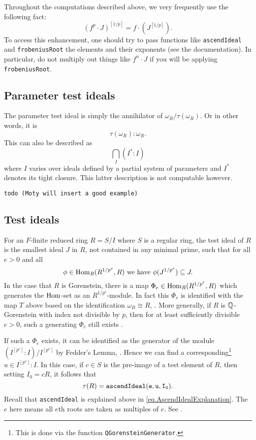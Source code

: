 \documentclass[11pt]{amsart}
\begin{document}
\begin{remark}
Throughout the computations described above, we very frequently use the following fact:
\[
(f^p \cdot J)^{[1/p]} = f \cdot (J^{[1/p]}).
\]
To access this enhancement, one should try to pass functions like {\tt ascendIdeal} and {\tt frobeniusRoot} the elements and their exponents (see the documentation).  In particular, do not multiply out things like $f^n \cdot J$ if you will be applying {\tt frobeniusRoot}.
\end{remark}

\subsection{Parameter test ideals}

The parameter test ideal is simply the annihilator of $\omega_R/\tau(\omega_R)$.  Or in other words, it is
\[
\tau(\omega_R) : \omega_R.
\]
This can also be described as
\[
\bigcap_{I} (I^* : I)
\]
where $I$ varies over ideals defined by a partial system of parameters and $I^*$ denotes its tight closure.  This latter description is not computable however.

\begin{verbatim}
todo (Moty will insert a good example)
\end{verbatim}

\subsection{Test ideals}

For an $F$-finite reduced ring $R = S/I$ where $S$ is a regular ring, the test ideal of $R$ is the smallest ideal $J$ in $R$, not contained in any minimal prime, such that for all $e > 0$ and all
\[
\phi \in \operatorname{Hom}_R(R^{1/p^e}, R) \text{ we have } \phi(J^{1/p^e}) \subseteq J.
\]
In the case that $R$ is Gorenstein, there is a map $\Phi_e \in \operatorname{Hom}_R(R^{1/p^e}, R)$ which generates the $\operatorname{Hom}$-set as an $R^{1/p^e}$-module.  In fact this $\Phi_e$ is identified with the map $T$ above based on the identification $\omega_R \cong R$, \cite{}.  More generally, if $R$ is $\mathbb{Q}$-Gorenstein with index not divisible by $p$, then for at least sufficiently divisible $e > 0$, such a generating $\Phi_e$ still exists \cite{}.

If such a $\Phi_e$ exists, it can be identified as the generator of the module $(I^{[p^e]} : I) / I^{[p^e]}$ by Fedder's Lemma, \cite{}.  Hence we can find a corresponding\footnote{This is done via the function {\tt QGorensteinGenerator}. } $u \in I^{[p^e]} : I$.  In this case, if $c \in S$ is the pre-image of a test element of $R$, then setting $I_0 = cR$, it follows that
\[
\tau(R) = {\tt ascendIdeal(e, u, I_0)}.
\]
Recall that {\tt ascendIdeal} is explained above in \autoref{eq.AscendIdealExplanation}.  The $e$ here means all $e$th roots are taken as multiples of $e$.  See \cite{}.
\end{document}
